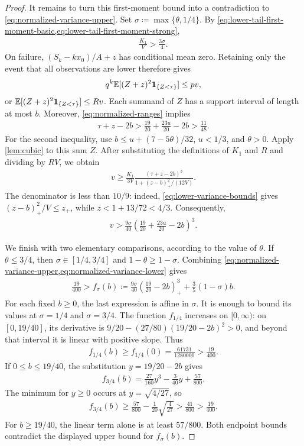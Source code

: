 \begin{proof}
It remains to turn this first-moment bound into a contradiction to \cref{eq:normalized-variance-upper}.
Set $\sigma\coloneqq\max\{\theta,1/4\}$.
By \cref{eq:lower-tail-first-moment-basic,eq:lower-tail-first-moment-strong},
\begin{align*}
 \frac{K_1}{V}>\frac{3\sigma}{4}.
\end{align*}
On failure, $(S_k-kx_0)/A+z$ has conditional mean zero.
Retaining only the event that all observations are lower therefore gives
\begin{align*}
 q^k\mathbb E[(Z+z)^2\mathbf 1_{\{Z<\tau\}}]\le pv,
\end{align*}
or $\mathbb E[(Z+z)^2\mathbf 1_{\{Z<\tau\}}]\le Rv$.
Each summand of $Z$ has a support interval of length at most $b$.
Moreover, \cref{eq:normalized-ranges} implies
\begin{align*}
 \tau+z-2b
 >\frac{19}{20}+\frac{23u}{20}-2b
 >\frac{11}{48}.
\end{align*}
For the second inequality, use $b\le u+(7-5\theta)/32$, $u<1/3$, and $\theta>0$.
Apply \cref{lem:cubic} to this sum $Z$.
After substituting the definitions of $K_1$ and $R$ and dividing by $RV$, we obtain
\begin{align*}
 v\ge\frac{K_1}{3V}
 \frac{(\tau+z-2b)^3}{1+(z-b)_+^2/(12V)}.
\end{align*}
The denominator is less than $10/9$: indeed, \cref{eq:lower-variance-bounds} gives
$(z-b)_+^2/V\le z_+$, while
$z<1+13/72<4/3$.
Consequently,
\begin{align}
 v>\frac{9\sigma}{40}\left(\frac{19}{20}+\frac{23u}{20}-2b\right)^3.
 \label{eq:normalized-variance-lower}
\end{align}

We finish with two elementary comparisons, according to the value of $\theta$.
If $\theta\le3/4$, then $\sigma\in[1/4,3/4]$ and $1-\theta\ge1-\sigma$.
Combining \cref{eq:normalized-variance-upper,eq:normalized-variance-lower} gives
\begin{align*}
 \frac{19}{400}
 >f_\sigma(b)\coloneqq
 \frac{9\sigma}{40}\left(\frac{19}{20}-2b\right)_+^3
 +\frac35(1-\sigma)b.
\end{align*}
For each fixed $b\ge0$, the last expression is affine in $\sigma$.
It is enough to bound its values at $\sigma=1/4$ and $\sigma=3/4$.
The function $f_{1/4}$ increases on $[0,\infty)$: on $[0,19/40]$, its derivative is
$9/20-(27/80)(19/20-2b)^2>0$, and beyond that interval it is linear with positive slope.
Thus
\begin{align*}
 f_{1/4}(b)\ge f_{1/4}(0)
 =\frac{61731}{1280000}>\frac{19}{400}.
\end{align*}
If $0\le b\le19/40$, the substitution $y=19/20-2b$ gives
\begin{align*}
 f_{3/4}(b)=\frac{27}{160}y^3-\frac3{40}y+\frac{57}{800}.
\end{align*}
The minimum for $y\ge0$ occurs at $y=\sqrt{4/27}$, so
\begin{align*}
 f_{3/4}(b)
 \ge\frac{57}{800}-\frac1{20}\sqrt{\frac4{27}}
 >\frac{41}{800}>\frac{19}{400}.
\end{align*}
For $b\ge19/40$, the linear term alone is at least $57/800$.
Both endpoint bounds contradict the displayed upper bound for $f_\sigma(b)$.


\end{proof}
